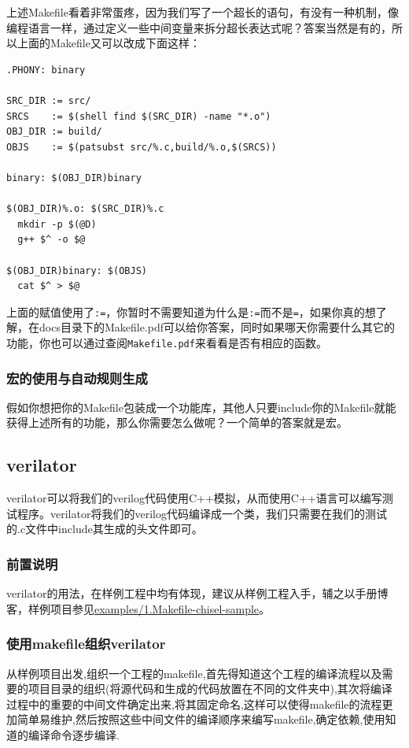 \documentclass[lang=cn,11pt,a4paper]{elegantpaper}
\begin{document}
上述Makefile看着非常蛋疼，因为我们写了一个超长的语句，有没有一种机制，像编程语言一样，通过定义一些中间变量来拆分超长表达式呢？答案当然是有的，所以上面的Makefile又可以改成下面这样：

\begin{lstlisting}
.PHONY: binary

SRC_DIR := src/
SRCS    := $(shell find $(SRC_DIR) -name "*.o")
OBJ_DIR := build/
OBJS    := $(patsubst src/%.c,build/%.o,$(SRCS))

binary: $(OBJ_DIR)binary

$(OBJ_DIR)%.o: $(SRC_DIR)%.c
  mkdir -p $(@D)
  g++ $^ -o $@

$(OBJ_DIR)binary: $(OBJS)
  cat $^ > $@
\end{lstlisting}

上面的赋值使用了\lstinline!:=!，你暂时不需要知道为什么是\lstinline!:=!而不是\lstinline!=!，如果你真的想了解，在docs目录下的Makefile.pdf可以给你答案，同时如果哪天你需要什么其它的功能，你也可以通过查阅\lstinline!Makefile.pdf!来看看是否有相应的函数。

\subsubsection{宏的使用与自动规则生成}

假如你想把你的Makefile包装成一个功能库，其他人只要include你的Makefile就能获得上述所有的功能，那么你需要怎么做呢？一个简单的答案就是宏。

\subsection{verilator}\label{verilator}
verilator可以将我们的verilog代码使用C++模拟，从而使用C++语言可以编写测试程序。verilator将我们的verilog代码编译成一个类，我们只需要在我们的测试的.c文件中include其生成的头文件即可。

\subsubsection{前置说明}
verilator的用法，在样例工程中均有体现，建议从样例工程入手，辅之以手册博客，样例项目参见\href{../examples/1.Makefile-chisel-sample}{examples/1.Makefile-chisel-sample}。

\subsubsection{使用makefile组织verilator}
从样例项目出发,组织一个工程的makefile,首先得知道这个工程的编译流程以及需要的项目目录的组织(将源代码和生成的代码放置在不同的文件夹中),其次将编译过程中的重要的中间文件确定出来,将其固定命名,这样可以使得makefile的流程更加简单易维护,然后按照这些中间文件的编译顺序来编写makefile,确定依赖,使用知道的编译命令逐步编译.
\end{document}
